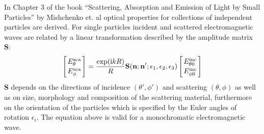 \label{sec:scattering:hydrometeor_species}

\label{sec:scattering:particle_ensembles}

In Chapter 3 of the book ``Scattering, Absorption and Emission of
Light by Small Particles'' by Mishchenko et. al \cite{Mishchenko:02}
optical properties for collections of independent particles are
derived.  For single particles incident and scattered electromagnetic
waves are related by a linear transformation described by the
amplitude matrix {\bf S}:
 \begin{eqnarray}
  \label{eq:ampl_matrix}
  \left[{E^{\rm sca}_{\theta}\atop E^{\rm sca}_{\phi}}\right] =
  \frac{\exp({\rm i} kR)}{R}{\bf S}({\bf n};{\bf
      n'};\epsilon_1,\epsilon_2,\epsilon_3)\left[{E^{\rm inc}_{\theta
          0}\atop E^{\rm inc}_{\phi 0}}\right] 
\end{eqnarray}
{\bf S} depends on the directions of incidence $(\theta', \phi')$ and
scattering $(\theta, \phi)$ as well as on size, morphology and
composition of the scattering material, furthermore on the orientation
of the particles which is specified by the Euler angles of rotation
$\epsilon _i$.  The equation above is valid for a monochromatic electromagnetic  wave.

